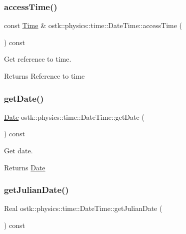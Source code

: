 \subsubsection{\texorpdfstring{access\+Time()}{accessTime()}}
{\footnotesize\ttfamily const \hyperlink{classostk_1_1physics_1_1time_1_1_time}{Time} \& ostk\+::physics\+::time\+::\+Date\+Time\+::access\+Time (\begin{DoxyParamCaption}{ }\end{DoxyParamCaption}) const}



Get reference to time. 

\begin{DoxyReturn}{Returns}
Reference to time 
\end{DoxyReturn}
\mbox{\label{classostk_1_1physics_1_1time_1_1_date_time_aafd979e2eb7095ee7bc8bb3e9a1b52ae}} 
\subsubsection{\texorpdfstring{get\+Date()}{getDate()}}
{\footnotesize\ttfamily \hyperlink{classostk_1_1physics_1_1time_1_1_date}{Date} ostk\+::physics\+::time\+::\+Date\+Time\+::get\+Date (\begin{DoxyParamCaption}{ }\end{DoxyParamCaption}) const}



Get date. 

\begin{DoxyReturn}{Returns}
\hyperlink{classostk_1_1physics_1_1time_1_1_date}{Date} 
\end{DoxyReturn}
\mbox{\label{classostk_1_1physics_1_1time_1_1_date_time_a067835c455394e18072d654455ac89cb}} 
\subsubsection{\texorpdfstring{get\+Julian\+Date()}{getJulianDate()}}
{\footnotesize\ttfamily Real ostk\+::physics\+::time\+::\+Date\+Time\+::get\+Julian\+Date (\begin{DoxyParamCaption}{ }\end{DoxyParamCaption}) const}



